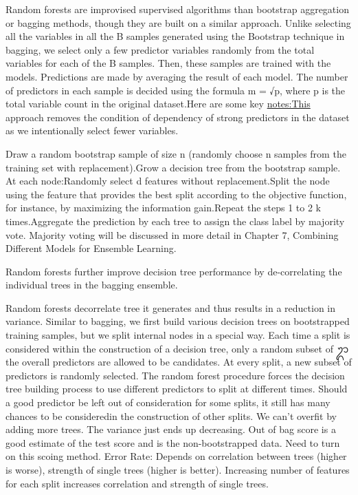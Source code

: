 \documentclass[]{book}
\begin{document}
Random forests are improvised supervised algorithms than bootstrap aggregation or bagging methods, though they are built on a similar approach. Unlike selecting all the variables in all the B samples generated using the Bootstrap technique in bagging, we select only a few predictor variables randomly from the total variables for each of the B samples. Then, these samples are trained with the models. Predictions are made by averaging the result of each model. The number of predictors in each sample is decided using the formula m = √p, where p is the total variable count in the original dataset.Here are some key \url{notes:This} approach removes the condition of dependency of strong predictors in the dataset as we intentionally select fewer variables.

Draw a random bootstrap sample of size n (randomly choose n samples from the training set with replacement).Grow a decision tree from the bootstrap sample. At each node:Randomly select d features without replacement.Split the node using the feature that provides the best split according to the objective function, for instance, by maximizing the information gain.Repeat the steps 1 to 2 k times.Aggregate the prediction by each tree to assign the class label by majority vote. Majority voting will be discussed in more detail in Chapter 7, Combining Different Models for Ensemble Learning.

Random forests further improve decision tree performance by de-correlating the individual trees in the bagging ensemble.

Random forests decorrelate tree it generates and thus results in a reduction in variance. Similar to bagging, we first build various decision trees on bootstrapped training samples, but we split internal nodes in a special way. Each time a split is considered within the construction of a decision tree, only a random subset of ᬊthe overall predictors are allowed to be candidates. At every split, a new subset of predictors is randomly selected. The random forest procedure forces the decision tree building process to use different predictors to split at different times. Should a good predictor be left out of consideration for some splits, it still has many chances to be consideredin the construction of other splits. We can't overfit by adding more trees. The variance just ends up decreasing. Out of bag score is a good estimate of the test score and is the non-bootstrapped data. Need to turn on this scoing method.
Error Rate: Depends on correlation between trees (higher is worse), strength of single trees (higher is better). Increasing number of features for each split increases correlation and strength of single trees.
\end{document}

